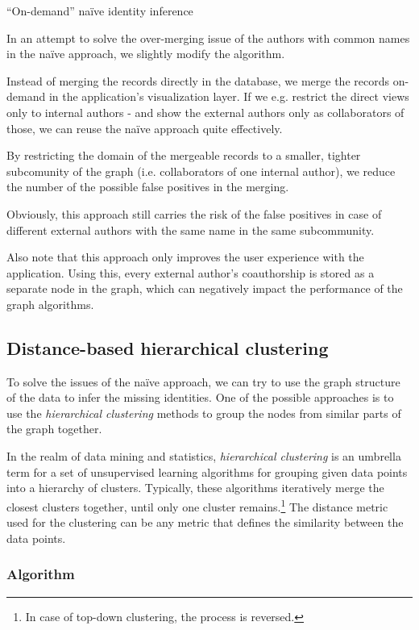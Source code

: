 \begin{mybox}{``On-demand'' naïve identity inference}

In an attempt to solve the over-merging issue of the authors with common names in the naïve approach, we slightly modify the algorithm.

Instead of merging the records directly in the database, we merge the records on-demand in the application's visualization layer.
If we e.g. restrict the direct views only to internal authors - and show the external authors only as collaborators of those,
we can reuse the naïve approach quite effectively.

By restricting the domain of the mergeable records to a smaller, tighter subcomunity of the graph (i.e. collaborators of one internal author), 
we reduce the number of the possible false positives in the merging.

Obviously, this approach still carries the risk of the false positives in case of different external authors with the same name in the same subcommunity.

Also note that this approach only improves the user experience with the application.
Using this, every external author's coauthorship is stored as a separate node in the graph, which can negatively impact the performance of the graph algorithms.
\end{mybox}


\subsection{Distance-based hierarchical clustering}

To solve the issues of the naïve approach, we can try to use the graph structure of the data to infer the missing identities.
One of the possible approaches is to use the \textit{hierarchical clustering} methods to group the nodes from similar parts of the graph together.

In the realm of data mining and statistics, \textit{hierarchical clustering} is an umbrella term for a set of unsupervised learning algorithms for grouping
given data points into a hierarchy of clusters. Typically, these algorithms iteratively merge the closest clusters together, until only one cluster remains.\footnote{In case of top-down clustering, the process is reversed.}
The distance metric used for the clustering can be any metric that defines the similarity between the data points.

\subsubsection{Algorithm}\label{sec:distance-based-hierarchical-clustering}

